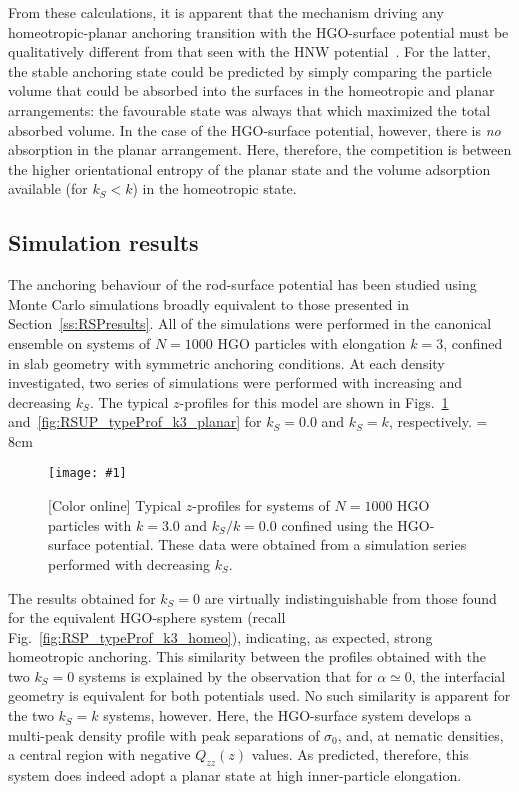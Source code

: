 \documentclass[aps,10pt,twocolumn]{revtex4}
\newlength{\picW}   %
\newcommand{\pic}[1]{\texttt{[image: \#1]}}
\begin{document}
From these calculations, it is apparent that the mechanism driving any homeotropic-planar anchoring transition
with the HGO-surface potential must be qualitatively different from that seen with the HNW
potential~\cite{BarmesCleaver04a}. For the latter, the stable anchoring state could be predicted by simply
comparing the particle volume that could be absorbed into the surfaces in the homeotropic and planar arrangements:
the favourable state was always that which maximized the total absorbed volume. In the case of the HGO-surface
potential, however, there is {\em no} absorption in the planar arrangement. Here, therefore, the competition is
between the higher orientational entropy of the planar state and the volume adsorption available (for $k_S<k$) in
the homeotropic state.

\subsection{Simulation results}
The anchoring behaviour of the rod-surface potential has been studied using Monte Carlo simulations broadly
equivalent to those presented in Section~\ref{ss:RSPresults}. All of the simulations were performed in the
canonical ensemble on systems of $N=1000$ HGO particles with elongation $k=3$, confined in slab geometry with
symmetric anchoring conditions. At each density investigated, two series of simulations were performed with
increasing and decreasing $k_S$. The typical $z$-profiles for this model are shown in
Figs.~\ref{fig:RSUP_typeProf_k3_homeo} and~\ref{fig:RSUP_typeProf_k3_planar} for $k_S=0.0$ and $k_S = k$,
respectively.
\picW = 8cm
\begin{figure}
    \centering
    \pic{fig_09.ps}
    \caption{[Color online] Typical $z$-profiles for systems of $N=1000$ HGO particles with
    $k=3.0$ and $k_S/k = 0.0$ confined using the HGO-surface potential.
    These data were obtained from a simulation series performed with decreasing $k_S$.}
    \label{fig:RSUP_typeProf_k3_homeo}
\end{figure}

The results obtained for $k_S=0$ are virtually indistinguishable from those found for the equivalent HGO-sphere
system (recall Fig.~\ref{fig:RSP_typeProf_k3_homeo}), indicating, as expected, strong homeotropic anchoring. This
similarity between the profiles obtained with the two $k_S=0$ systems is explained by the observation that for
$\alpha \simeq 0$, the interfacial geometry is equivalent for both potentials used. No such similarity is apparent
for the two $k_S=k$ systems, however. Here, the HGO-surface system develops a multi-peak density profile with peak
separations of $\sigma_0$, and, at nematic densities, a central region with negative $Q_{zz}(z)$ values. As
predicted, therefore, this system does indeed adopt a planar state at high inner-particle elongation.
\end{document}
